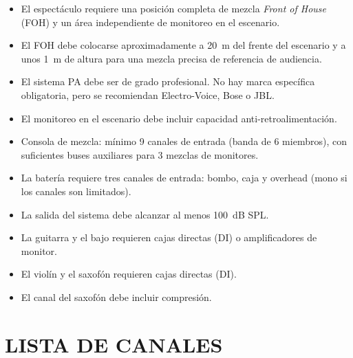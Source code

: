 \documentclass[a4paper,12pt]{article}
\newcommand{\sect}[1]{\section*{\normalfont\Large\bfseries\MakeUppercase{#1}}}
\begin{document}
\begin{itemize}[leftmargin=1.4em, itemsep=0.4em]
    \item El espectáculo requiere una posición completa de mezcla \emph{Front of House} (FOH) y un área independiente de monitoreo en el escenario.
    \item El FOH debe colocarse aproximadamente a 20~m del frente del escenario y a unos 1~m de altura para una mezcla precisa de referencia de audiencia.
    \item El sistema PA debe ser de grado profesional. No hay marca específica obligatoria, pero se recomiendan Electro-Voice, Bose o JBL.
    \item El monitoreo en el escenario debe incluir capacidad anti-retroalimentación.
    \item Consola de mezcla: mínimo 9 canales de entrada (banda de 6 miembros), con suficientes buses auxiliares para 3 mezclas de monitores.
    \item La batería requiere tres canales de entrada: bombo, caja y overhead (mono si los canales son limitados).
    \item La salida del sistema debe alcanzar al menos 100~dB SPL.
    \item La guitarra y el bajo requieren cajas directas (DI) o amplificadores de monitor.
    \item El violín y el saxofón requieren cajas directas (DI).
    \item El canal del saxofón debe incluir compresión.
\end{itemize}

\sect{Lista de Canales}
\end{document}
